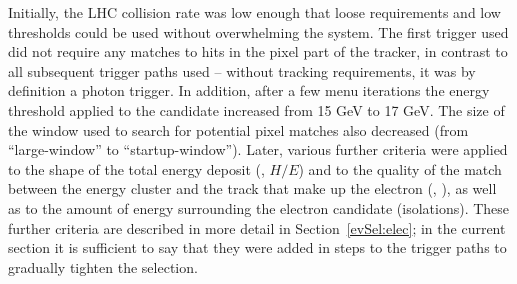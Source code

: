 Initially, the LHC collision rate was low enough that loose 
requirements and low thresholds could be used without 
overwhelming the system.  
The first trigger used did not require any matches to 
hits in the pixel part of the tracker, 
in contrast to all subsequent trigger paths used -- 
without tracking requirements, it was by definition a 
photon trigger.  
In addition, after a few menu iterations 
the energy threshold applied to the candidate 
increased from 15 GeV to 17 GeV.  
The size of the window used to search for potential pixel 
matches also decreased (from ``large-window'' to ``startup-window'').%
Later, various further criteria were applied to 
the shape of the total energy deposit (\sieie, $H/E$) and 
to the quality of the match between the energy cluster and the track 
that make up the electron (\detain, \dphiin), 
as well as to the amount of energy surrounding 
the electron candidate (isolations).  
These further criteria are described in more detail in 
Section~\ref{evSel:elec}; 
in the current section it is sufficient to say that they 
were added in steps to the trigger paths to gradually tighten the 
selection.  















